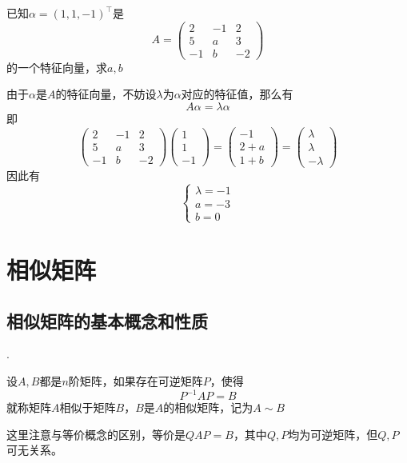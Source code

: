 \begin{example}
    已知$\alpha=(1,1,-1)^\intercal$是
    \[
        A =
        \begin{pmatrix}
            2  & -1 & 2  \\
            5  & a  & 3  \\
            -1 & b  & -2
        \end{pmatrix}
    \]
    的一个特征向量，求$a,b$
\end{example}
\begin{solution}
    由于$\alpha$是$A$的特征向量，不妨设$\lambda$为$\alpha$对应的特征值，那么有
    \[ A\alpha = \lambda\alpha \]
    即
    \[
        \begin{pmatrix}
            2  & -1 & 2  \\
            5  & a  & 3  \\
            -1 & b  & -2
        \end{pmatrix}
        \begin{pmatrix}
            1 \\1\\-1
        \end{pmatrix}
        =
        \begin{pmatrix}
            -1 \\ 2+a \\ 1+b
        \end{pmatrix}
        =
        \begin{pmatrix}
            \lambda \\ \lambda \\ -\lambda
        \end{pmatrix}
    \]
    因此有
    \[
        \begin{cases}
            \lambda = -1 \\
            a = -3       \\
            b=0
        \end{cases}
    \]
\end{solution}

\section{相似矩阵}
\subsection{相似矩阵的基本概念和性质}
.
\begin{definition}
    设$A,B$都是$n$阶矩阵，如果存在可逆矩阵$P$，使得
    \[ P^{-1}AP = B \]
    就称矩阵$A$相似于矩阵$B$，$B$是$A$的相似矩阵，记为$A\sim B$
\end{definition}
这里注意与等价概念的区别，等价是$QAP=B$，其中$Q,P$均为可逆矩阵，但$Q,P$可无关系。

